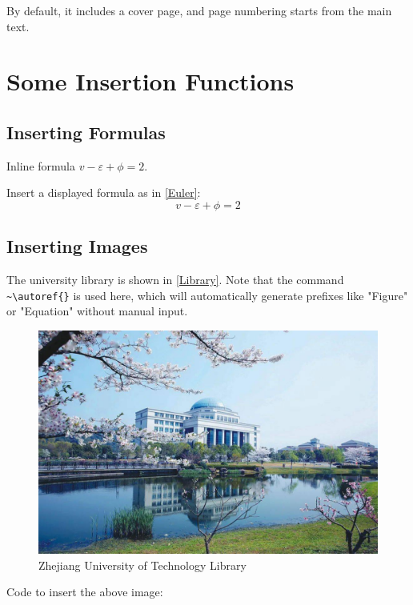 \documentclass[12pt,a4paper]{article}
\begin{document}
By default, it includes a cover page, and page numbering starts from the main text.

\section{Some Insertion Functions}
\subsection{Inserting Formulas}
Inline formula $v-\varepsilon+\phi=2$.

Insert a displayed formula as in \autoref{Euler}:
\begin{equation}
    v-\varepsilon+\phi=2
    \label{Euler}
\end{equation}

\subsection{Inserting Images}
The university library is shown in \autoref{Library}. Note that the command \verb|~\autoref{}| is used here, which will automatically generate prefixes like "Figure" or "Equation" without manual input.

\begin{figure}[!htbp]
    \centering
    \includegraphics[width =.9\textwidth]{figures/zjut_library.jpeg}
    \caption{Zhejiang University of Technology Library}
    \label{Library}
\end{figure}

Code to insert the above image:
\end{document}
